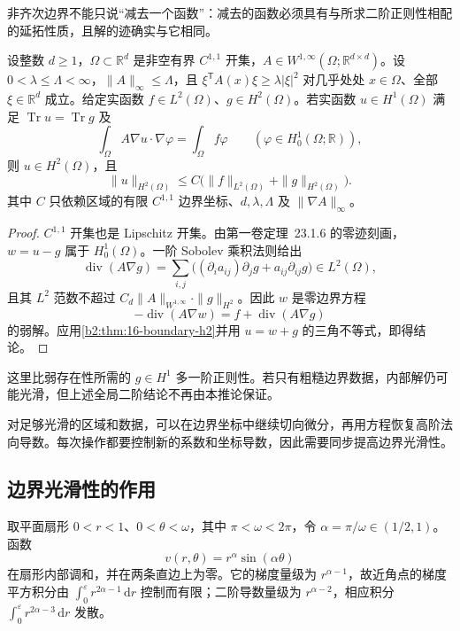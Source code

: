 非齐次边界不能只说“减去一个函数”：减去的函数必须具有与所求二阶正则性相配的延拓性质，且解的迹确实与它相同。

\begin{corollary}
\label{b2:cor:16-nonhomogeneous-boundary-h2}
设整数 \(d\geq1\)，\(\Omega\subset\mathbb R^d\) 是非空有界 \(C^{1,1}\) 开集，\(A\in W^{1,\infty}(\Omega;\mathbb R^{d\times d})\)。设 \(0<\lambda\leq\Lambda<\infty\)，\(\|A\|_\infty\leq\Lambda\)，且 \(\xi^{\mathsf T}A(x)\xi\geq\lambda|\xi|^2\) 对几乎处处 \(x\in\Omega\)、全部 \(\xi\in\mathbb R^d\) 成立。给定实函数 \(f\in L^2(\Omega)\)、\(g\in H^2(\Omega)\)。若实函数 \(u\in H^1(\Omega)\) 满足 \(\operatorname{Tr}u=\operatorname{Tr}g\) 及
\[\int_\Omega A\nabla u\cdot\nabla\varphi
 =\int_\Omega f\varphi\qquad(\varphi\in H_0^1(\Omega;\mathbb R)),\]
则 \(u\in H^2(\Omega)\)，且
\[\|u\|_{H^2(\Omega)}
 \leq C\bigl(\|f\|_{L^2(\Omega)}+\|g\|_{H^2(\Omega)}\bigr).\]
其中 \(C\) 只依赖区域的有限 \(C^{1,1}\) 边界坐标、\(d,\lambda,\Lambda\) 及 \(\|\nabla A\|_\infty\)。
\end{corollary}
\begin{proof}
\(C^{1,1}\) 开集也是 Lipschitz 开集。由第一卷定理~23.1.6 的零迹刻画，\(w=u-g\) 属于 \(H_0^1(\Omega)\)。一阶 Sobolev 乘积法则给出
\[
 \operatorname{div}(A\nabla g)
 =\sum_{i,j}\bigl((\partial_i a_{ij})\partial_jg
                  +a_{ij}\partial_{ij}g\bigr)\in L^2(\Omega),
\]
且其 \(L^2\) 范数不超过 \(C_d\|A\|_{W^{1,\infty}}\cdot\|g\|_{H^2}\)。因此 \(w\) 是零边界方程
\[-\operatorname{div}(A\nabla w)
       =f+\operatorname{div}(A\nabla g)\]
的弱解。应用\cref{b2:thm:16-boundary-h2}并用 \(u=w+g\) 的三角不等式，即得结论。
\end{proof}

这里比弱存在性所需的 \(g\in H^1\) 多一阶正则性。若只有粗糙边界数据，内部解仍可能光滑，但上述全局二阶结论不再由本推论保证。

\ProseParagraphBreak

对足够光滑的区域和数据，可以在边界坐标中继续切向微分，再用方程恢复高阶法向导数。每次操作都要控制新的系数和坐标导数，因此需要同步提高边界光滑性。

\subsection{边界光滑性的作用}
\label{b2:subsec:160304}

取平面扇形 \(0<r<1\)、\(0<\theta<\omega\)，其中 \(\pi<\omega<2\pi\)，令 \(\alpha=\pi/\omega\in(1/2,1)\)。函数
\[v(r,\theta)=r^\alpha\sin(\alpha\theta)\]
在扇形内部调和，并在两条直边上为零。它的梯度量级为 \(r^{\alpha-1}\)，故近角点的梯度平方积分由 \(\int_0^\varepsilon r^{2\alpha-1}\,\mathrm dr\) 控制而有限；二阶导数量级为 \(r^{\alpha-2}\)，相应积分 \(\int_0^\varepsilon r^{2\alpha-3}\,\mathrm dr\) 发散。

